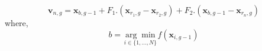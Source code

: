 \begin{equation}
    \mathbf{v}_{n, g}=\mathbf{x}_{b, g-1}
+F_{1}.\left(\mathbf{x}_{r_{1}, g}-\mathbf{x}_{r_{2}, g}\right)
+F_{2}.\left(\mathbf{x}_{b, g-1}-\mathbf{x}_{r_n, g}\right)  
    \label{DE-ctob-2}
\end{equation}
where,
$$
b=\underset{i \in\{1, \ldots, N\}}{\arg \min } f\left(\mathbf{x}_{i, g-1}\right)
$$
